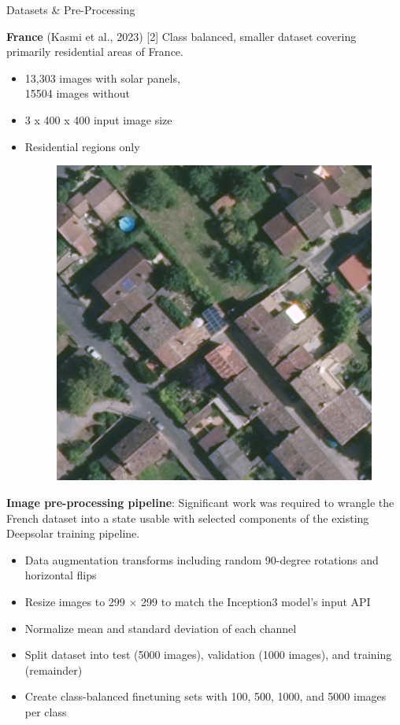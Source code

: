 \documentclass[final]{beamer}
\newlength{\colwidth}
\begin{document}
\begin{frame}[t]
\begin{columns}[t]
\begin{column}{\colwidth}
\begin{block}{\large Datasets \& Pre-Processing}
\begin{adjustbox}
\begin{minipage}[t]{0.45\linewidth}
\textbf{France} (Kasmi et al., 2023) [2]
Class balanced, smaller dataset covering primarily residential areas of France. 
\begin{itemize}
  \item 13,303 images with solar panels, \\
  15504 images without
  \item 3 x 400 x 400 input image size
  \item Residential regions only
\begin{figure}
\centering
\includegraphics[width=12cm]{img_french.png}
\end{figure}
\end{itemize}

\end{minipage}
\end{adjustbox}
\vspace{48pt}
\linebreak
\textbf{Image pre-processing pipeline}: Significant work was required to wrangle the French dataset into a state usable with selected components of the existing Deepsolar training pipeline.
\begin{itemize}
  \item Data augmentation transforms including random 90-degree rotations and horizontal flips
  \item Resize images to 299 $\times$ 299 to match the Inception3 model's input API 
  \item Normalize mean and standard deviation of each channel
  \item Split dataset into test (5000 images), validation (1000 images), and training (remainder)
  \item Create class-balanced finetuning sets with 100, 500, 1000, and 5000 images per class
\end{itemize}


\end{block}
\end{column}
\end{columns}
\end{frame}
\end{document}
